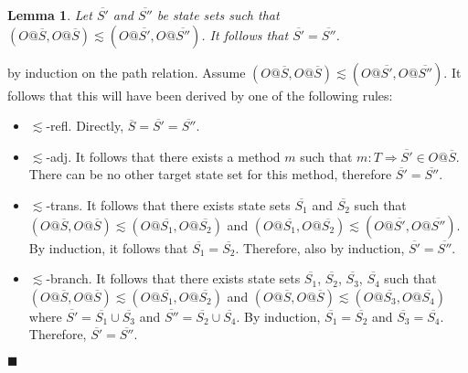 \documentclass[preprint]{sigplanconf}
\makeatletter
\newtheorem{lem}{Lemma}
\newcommand{\ot}[2]{#1@\overline{#2}}
\newcommand{\pathrefl}{$\lesssim${\sc-refl}}
\newcommand{\pathadj}{$\lesssim${\sc-adj}}
\newcommand{\pathtrans}{$\lesssim${\sc-trans}}
\newcommand{\pathbranch}{$\lesssim${\sc-branch}}
\newcommand{\qed}{$\blacksquare$}
\newenvironment{proof}{\vspace{1ex}\noindent{\bf Proof}\hspace{0.5em}}
  {\hfill\qed\vspace{1ex}}
\makeatother
\begin{document}
\begin{lem}
\label{lem:lesssim_same}
Let $\overline{S'}$ and $\overline{S''}$ be state sets such that
$(\ot{O}{S}, \ot{O}{S}) \lesssim (\ot{O}{S'}, \ot{O}{S''})$. It follows
that $\overline{S'} = \overline{S''}$.
\end{lem}

\begin{proof}
by induction on the path relation. Assume 
$(\ot{O}{S}, \ot{O}{S}) \lesssim (\ot{O}{S'}, \ot{O}{S''})$. It follows that
this will have been derived by one of the following rules:

\begin{itemize}

\item \pathrefl. Directly, $\overline{S} = \overline{S'} = \overline{S''}$.

\item \pathadj. It follows that there exists a method $m$ such that
$m : T \Rightarrow \overline{S'} \in \ot{O}{S}$. There can be no other
target state set for this method, therefore $\overline{S'} = \overline{S''}$.

\item \pathtrans. It follows that there exists state sets $\overline{S_1}$
and $\overline{S_2}$ such that
$(\ot{O}{S}, \ot{O}{S}) \lesssim (\ot{O}{S_1}, \ot{O}{S_2})$ and
$(\ot{O}{S_1}, \ot{O}{S_2}) \lesssim (\ot{O}{S'}, \ot{O}{S''})$. By induction,
it follows that $\overline{S_1} = \overline{S_2}$. Therefore, also by induction,
$\overline{S'} = \overline{S''}$.

\item \pathbranch. It follows that there exists state sets
$\overline{S_1}$, $\overline{S_2}$, $\overline{S_3}$, $\overline{S_4}$ such
that 
$(\ot{O}{S}, \ot{O}{S}) \lesssim (\ot{O}{S_1}, \ot{O}{S_2})$ and
$(\ot{O}{S}, \ot{O}{S}) \lesssim (\ot{O}{S_3}, \ot{O}{S_4})$ where
$\overline{S'} = \overline{S_1} \cup \overline{S_3}$ and
$\overline{S''} = \overline{S_2} \cup \overline{S_4}$.
By induction, $\overline{S_1} = \overline{S_2}$ and 
$\overline{S_3} = \overline{S_4}$. Therefore, $\overline{S'} = \overline{S''}$.

\end{itemize}
\end{proof}

\end{document}
